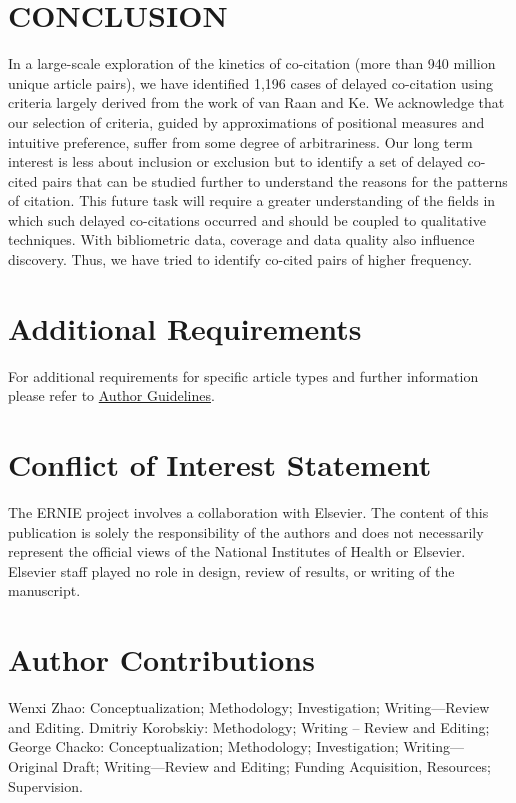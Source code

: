\documentclass[utf8]{frontiersSCNS}
\begin{document}
\section{CONCLUSION} In a large-scale exploration of the kinetics of co-citation (more than 940 million unique article pairs), we have identified 1,196 cases of delayed co-citation using criteria largely derived from the work of van Raan and Ke. We acknowledge that our selection of criteria, guided by approximations of positional measures and intuitive preference, suffer from some degree of arbitrariness. Our long term interest is less about inclusion or exclusion but to identify a set of delayed co-cited pairs that can be studied further to understand the reasons for the patterns of citation. This future task will require a greater understanding of the fields in which such delayed co-citations occurred and should be coupled to qualitative techniques. With bibliometric data, coverage and data quality also influence discovery. Thus, we have tried to identify co-cited pairs of higher frequency.  

\section{Additional Requirements}

For additional requirements for specific article types and further information please refer to \href{http://www.frontiersin.org/about/AuthorGuidelines#AdditionalRequirements}{Author Guidelines}.

\section*{Conflict of Interest Statement}
The ERNIE project involves a collaboration with Elsevier. The content of this publication is solely the responsibility of the authors and does not necessarily represent the official views of the National Institutes of Health or Elsevier.  Elsevier staff played no role in design, review of results, or writing of the manuscript. 

\section*{Author Contributions}

Wenxi Zhao: Conceptualization; Methodology; Investigation; Writing—Review and Editing. Dmitriy Korobskiy: Methodology; Writing – Review and Editing; George Chacko: Conceptualization; Methodology; Investigation; Writing—Original Draft; Writing—Review and Editing; Funding Acquisition, Resources; Supervision.
\end{document}
